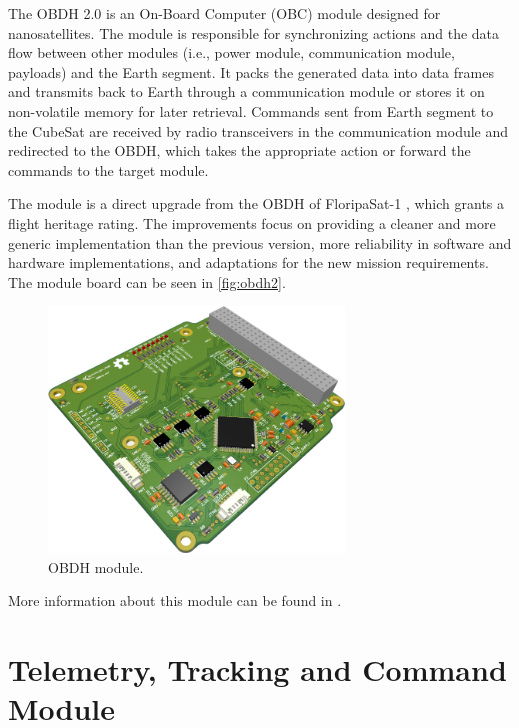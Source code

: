The OBDH 2.0 is an On-Board Computer (OBC) module designed for nanosatellites. The module is responsible for synchronizing actions and the data flow between other modules (i.e., power module, communication module, payloads) and the Earth segment. It packs the generated data into data frames and transmits back to Earth through a communication module or stores it on non-volatile memory for later retrieval. Commands sent from Earth segment to the CubeSat are received by radio transceivers in the communication module and redirected to the OBDH, which takes the appropriate action or forward the commands to the target module.

The module is a direct upgrade from the OBDH of FloripaSat-1 \cite{floripasat}, which grants a flight heritage rating. The improvements focus on providing a cleaner and more generic implementation than the previous version, more reliability in software and hardware implementations, and adaptations for the new mission requirements. The module board can be seen in \autoref{fig:obdh2}.

\begin{figure}[!ht]
    \begin{center}
        \includegraphics[width=0.7\textwidth]{figures/obdh2-pcb-3d}
        \caption{OBDH module.}
        \label{fig:obdh2}
    \end{center}
\end{figure}

More information about this module can be found in \cite{obdh2}.

\section{Telemetry, Tracking and Command Module}

